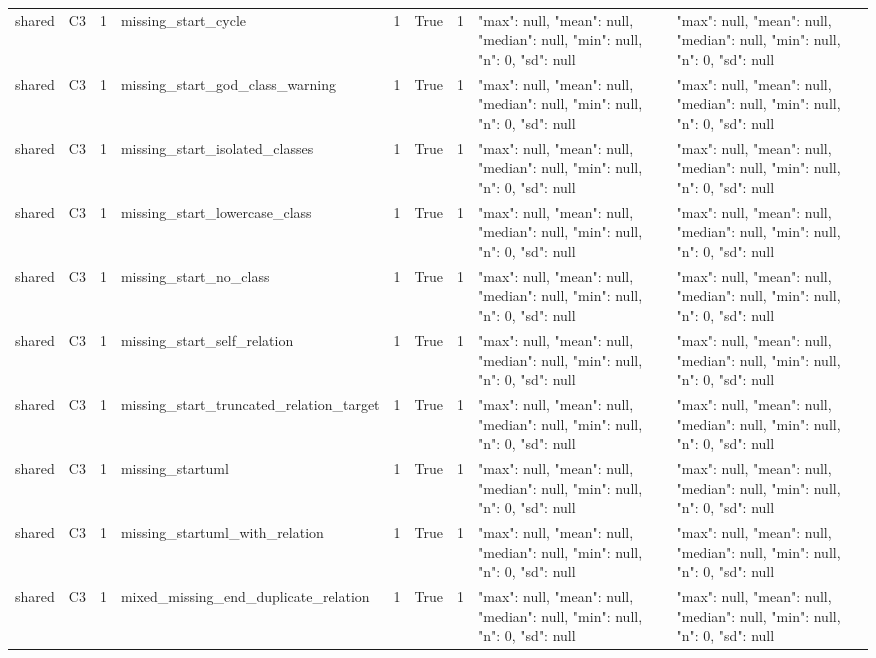 \begin{tabular}{lllllllll}
shared & C3 & 1 & missing\_start\_cycle & 1 & True & 1 & {"max": null, "mean": null, "median": null, "min": null, "n": 0, "sd": null} & {"max": null, "mean": null, "median": null, "min": null, "n": 0, "sd": null} \\
shared & C3 & 1 & missing\_start\_god\_class\_warning & 1 & True & 1 & {"max": null, "mean": null, "median": null, "min": null, "n": 0, "sd": null} & {"max": null, "mean": null, "median": null, "min": null, "n": 0, "sd": null} \\
shared & C3 & 1 & missing\_start\_isolated\_classes & 1 & True & 1 & {"max": null, "mean": null, "median": null, "min": null, "n": 0, "sd": null} & {"max": null, "mean": null, "median": null, "min": null, "n": 0, "sd": null} \\
shared & C3 & 1 & missing\_start\_lowercase\_class & 1 & True & 1 & {"max": null, "mean": null, "median": null, "min": null, "n": 0, "sd": null} & {"max": null, "mean": null, "median": null, "min": null, "n": 0, "sd": null} \\
shared & C3 & 1 & missing\_start\_no\_class & 1 & True & 1 & {"max": null, "mean": null, "median": null, "min": null, "n": 0, "sd": null} & {"max": null, "mean": null, "median": null, "min": null, "n": 0, "sd": null} \\
shared & C3 & 1 & missing\_start\_self\_relation & 1 & True & 1 & {"max": null, "mean": null, "median": null, "min": null, "n": 0, "sd": null} & {"max": null, "mean": null, "median": null, "min": null, "n": 0, "sd": null} \\
shared & C3 & 1 & missing\_start\_truncated\_relation\_target & 1 & True & 1 & {"max": null, "mean": null, "median": null, "min": null, "n": 0, "sd": null} & {"max": null, "mean": null, "median": null, "min": null, "n": 0, "sd": null} \\
shared & C3 & 1 & missing\_startuml & 1 & True & 1 & {"max": null, "mean": null, "median": null, "min": null, "n": 0, "sd": null} & {"max": null, "mean": null, "median": null, "min": null, "n": 0, "sd": null} \\
shared & C3 & 1 & missing\_startuml\_with\_relation & 1 & True & 1 & {"max": null, "mean": null, "median": null, "min": null, "n": 0, "sd": null} & {"max": null, "mean": null, "median": null, "min": null, "n": 0, "sd": null} \\
shared & C3 & 1 & mixed\_missing\_end\_duplicate\_relation & 1 & True & 1 & {"max": null, "mean": null, "median": null, "min": null, "n": 0, "sd": null} & {"max": null, "mean": null, "median": null, "min": null, "n": 0, "sd": null} \\

\end{tabular}
